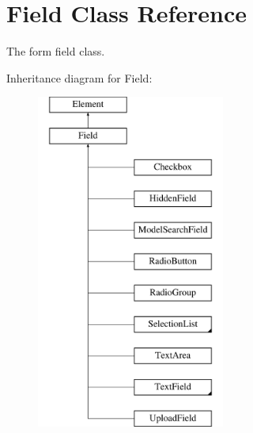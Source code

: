 \hypertarget{class_field}{
\section{Field Class Reference}
\label{class_field}
}


The form field class.  


Inheritance diagram for Field:\begin{figure}[H]
\begin{center}
\leavevmode
\includegraphics[height=11.000000cm]{class_field}
\end{center}
\end{figure}

